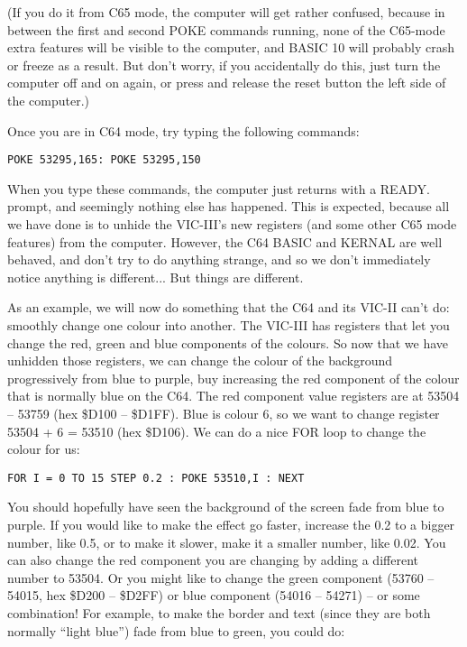 (If you do it from
C65 mode, the computer will get rather confused, because in between the first and second POKE commands running,
none of the C65-mode extra features will be visible to the computer, and BASIC 10 will probably crash or
freeze as a result. But don't worry, if you accidentally do this, just turn the computer off and on again,
or press and release the reset button the left side of the computer.)

Once you are in C64 mode, try typing the following commands:

\begin{tcolorbox}[colback=black,coltext=white]
\verbatimfont{\codefont}
\begin{verbatim}
POKE 53295,165: POKE 53295,150
\end{verbatim}
\end{tcolorbox}

When you type these commands, the computer just returns with a READY. prompt, and seemingly nothing else has
happened.  This is expected, because all we have done is to unhide the VIC-III's new registers (and some other
C65 mode features) from the computer.  However, the C64 BASIC and KERNAL are well behaved, and don't try to
do anything strange, and so we don't immediately notice anything is different... But things are different.

As an example, we will now do something that the C64 and its VIC-II can't do: smoothly change one colour into another.
The VIC-III has registers that let you change the red, green and blue components of the colours.  So now that we have
unhidden those registers, we can change the colour of the background progressively from blue to purple, buy increasing
the red component of the colour that is normally blue on the C64.  The red component value registers are at
53504 -- 53759 (hex \$D100 -- \$D1FF).  Blue is colour 6, so we want to change register 53504 + 6 = 53510 (hex \$D106).
We can do a nice FOR loop to change the colour for us:

\begin{tcolorbox}[colback=black,coltext=white]
\verbatimfont{\codefont}
\begin{verbatim}
FOR I = 0 TO 15 STEP 0.2 : POKE 53510,I : NEXT
\end{verbatim}
\end{tcolorbox}

You should hopefully have seen the background of the screen fade from blue to purple.  If you would like to
make the effect go faster, increase the 0.2 to a bigger number, like 0.5, or to make it slower, make it a smaller number, like 0.02.
You can also change the red component you are changing by adding a different number to 53504.  Or you might like to change the green
component (53760 -- 54015, hex \$D200 -- \$D2FF) or blue component (54016 -- 54271) -- or some combination!  For example, to make
the border and text (since they are both normally ``light blue'') fade from blue to green, you could do:

